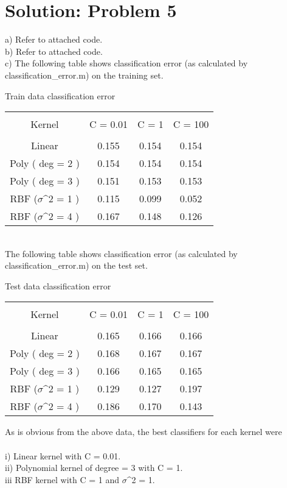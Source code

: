 \documentclass[twoside,10pt,a4paper]{article}
\theoremstyle{definition}
\theoremstyle{definition}
\theoremstyle{remark}
\renewcommand{\>}{{\rightarrow}}
\newcommand{\1}{{\mathbf 1}}
\newcommand{\0}{{\mathbf 0}}
\begin{document}
\section{Solution: Problem 5}
a) Refer to attached code. \\
b) Refer to attached code. \\
c) The following table shows classification error (as calculated by classification\_error.m) on the training set.
\begin{center}
Train data classification error\\
\begin{tabular}{|c|c|c|c|}
\hline
& & & \\
Kernel & C = 0.01 & C = 1 & C = 100 \\
& & & \\
\hline
Linear & 0.155 & 0.154 & 0.154 \\
\hline
Poly ( deg = 2 ) & 0.154 & 0.154  & 0.154 \\ 
\hline
Poly ( deg = 3 ) & 0.151 & 0.153 & 0.153 \\
\hline
RBF ($\sigma$^2 = 1 ) & 0.115 & 0.099 & 0.052 \\
\hline
RBF ($\sigma$^2 = 4 ) & 0.167 & 0.148 & 0.126 \\
\hline
\end{tabular}
\end{center}
~\\
The following table shows classification error (as calculated by classification\_error.m) on the test set.
\begin{center}
Test data classification error\\
\begin{tabular}{|c|c|c|c|}
\hline
& & & \\
Kernel & C = 0.01 & C = 1 & C = 100 \\
 & & & \\
\hline
Linear & 0.165 & 0.166 & 0.166 \\
\hline
Poly ( deg = 2 ) & 0.168 & 0.167  & 0.167 \\ 
\hline
Poly ( deg = 3 ) & 0.166 & 0.165 & 0.165 \\
\hline
RBF ($\sigma$^2 = 1 ) & 0.129 & 0.127 & 0.197 \\
\hline
RBF ($\sigma$^2 = 4 ) & 0.186 & 0.170 & 0.143 \\
\hline
\end{tabular}
\end{center}

As is obvious from the above data, the best classifiers for each kernel were \\ ~\\
i) Linear kernel with C = 0.01. \\
ii) Polynomial kernel of degree = 3 with C = 1.\\
iii RBF kernel with C = 1 and $\sigma$^2 = 1. \\
\end{document}
